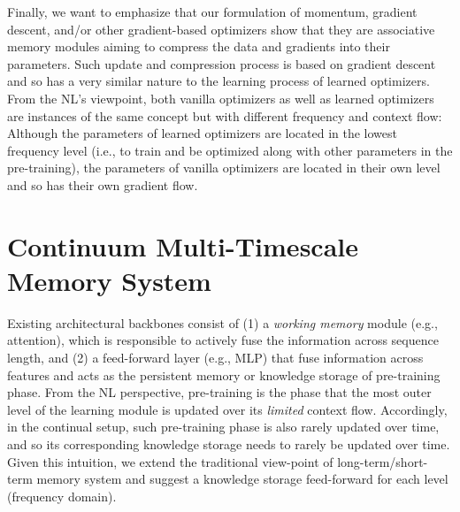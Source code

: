 {
Finally, we want to emphasize that our formulation of momentum, gradient descent, and/or other gradient-based optimizers show that they are associative memory modules aiming to compress the data and gradients into their parameters. Such update and compression process is based on gradient descent and so has a very similar nature to the learning process of learned optimizers. From the NL's viewpoint, both vanilla optimizers as well as learned optimizers are instances of the same concept but with different frequency and context flow: Although the parameters of learned optimizers are located in the lowest frequency level (i.e., to train and be optimized along with other parameters in the pre-training), the parameters of vanilla optimizers are located in their own level and so has their own gradient flow.             








\section{Continuum Multi-Timescale Memory System}\label{sec:cmlp}  
Existing architectural backbones consist of (1) a \emph{working memory} module (e.g., attention), which is responsible to actively fuse the information across sequence length, and (2) a feed-forward layer (e.g., MLP) that fuse information across features and acts as the persistent memory or knowledge storage of pre-training phase. From the NL perspective, pre-training is the phase that the most outer level of the learning module is updated over its \emph{limited} context flow. Accordingly, in the continual setup, such pre-training phase is also rarely updated over time, and so its corresponding knowledge storage needs to rarely be updated over time. Given this intuition, we extend the traditional view-point of long-term/short-term memory system and suggest a knowledge storage feed-forward for each level (frequency domain).       



}
